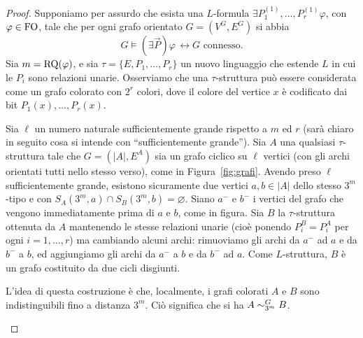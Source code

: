 \begin{proof}
  Supponiamo per assurdo che esista una $L$-formula $\exists P_1^{(1)},\ldots,P_r^{(1)} \varphi$, con $\varphi\in \operatorname{FO}$, tale che per ogni grafo orientato $G=(V^G, E^G)$ si abbia
  \[ G \models (\exists \vec{P}) \varphi \, \leftrightarrow G \text{ connesso}. \]
  Sia $m=\operatorname{RQ}(\varphi)$, e sia $\tau = \{E,P_1,\ldots,P_r\}$ un nuovo linguaggio che estende $L$ in cui le $P_i$ sono relazioni unarie.
  Osserviamo che una $\tau$-struttura può essere considerata come un grafo colorato con $2^r$ colori, dove il colore del vertice $x$ è codificato dai bit $P_1(x),\ldots,P_r(x)$.
  
  Sia $\ell$ un numero naturale sufficientemente grande rispetto a $m$ ed $r$ (sarà chiaro in seguito cosa si intende con ``sufficientemente grande'').
  Sia $A$ una qualsiasi $\tau$-struttura tale che $G=(|A|, E^A)$ sia un grafo ciclico su $\ell$ vertici (con gli archi orientati tutti nello stesso verso), come in Figura~\ref{fig:grafi}.
  Avendo preso $\ell$ sufficientemente grande, esistono sicuramente due vertici $a,b\in |A|$ dello stesso $3^m$-tipo e con $S_A(3^m,a) \cap S_B(3^m,b) = \varnothing$.
  Siano $a^-$ e $b^-$ i vertici del grafo che vengono immediatamente prima di $a$ e $b$, come in figura.
  Sia $B$ la $\tau$-struttura ottenuta da $A$ mantenendo le stesse relazioni unarie (cioè ponendo $P_i^B = P_i^A$ per ogni $i=1,\dots,r$) ma cambiando alcuni archi: rimuoviamo gli archi da $a^-$ ad $a$ e da $b^-$ a $b$, ed aggiungiamo gli archi da $a^-$ a $b$ e da $b^-$ ad $a$.
  Come $L$-struttura, $B$ è un grafo costituito da due cicli disgiunti.
  
  L'idea di questa costruzione è che, localmente, i grafi colorati $A$ e $B$ sono indistinguibili fino a distanza $3^m$.
  Ciò significa che si ha $A \sim^{G}_{3^m} B$.
  
  \begin{figure}[htbp]
    
    \begin{center}
\end{center}
\end{figure}
\end{proof}
